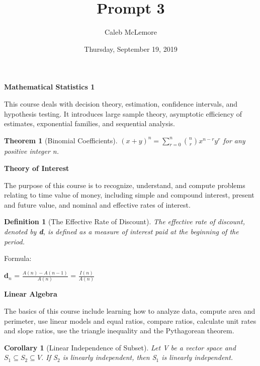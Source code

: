 \documentclass[12pt]{article}
\title{Prompt 3}
\author{Caleb McLemore }
\date{Thursday, September 19, 2019}
\newtheorem{thm}{Theorem}
\newtheorem{dfn}{Definition}
\newtheorem{cor}{Corollary}
\begin{document}
\maketitle
\newpage


\begin{center}
    \textbf{Mathematical Statistics 1}
\end{center}
This course deals with decision theory, estimation, confidence intervals, and hypothesis testing. It introduces large sample theory, asymptotic efficiency of estimates, exponential families, and sequential analysis.
\begin{thm}[Binomial Coefficients]
\((x+y)^{n} = \sum_{r=0}^{n} {{n}\choose{r}} x^{n-r} y^{r}\) for any positive integer n.
\end{thm}


\begin{center}
    \textbf{Theory of Interest}
\end{center}
The purpose of this course is to recognize, understand, and compute problems relating to time value of money, including simple and compound interest, present and future value, and nominal and effective rates of interest.
\begin{dfn}[The Effective Rate of Discount]
The effective rate of discount, denoted by \textbf{d}, is defined as a measure of interest paid at the beginning of the period.
\end{dfn}
Formula:
\begin{center}
    \textbf{d\(_n\)} = \(\frac{A(n)-A(n-1)}{A(n)}\) = \(\frac{I(n)}{A(n)}\)
\end{center}


\begin{center}
    \textbf{Linear Algebra}
\end{center}
The basics of this course include learning how to analyze data, compute area and perimeter, use linear models and equal ratios, compare ratios, calculate unit rates and slope ratios, use the triangle inequality and the Pythagorean theorem.
\begin{cor}[Linear Independence of Subset] 
Let V be a vector space and \(S_1 \subseteq{S_2} \subseteq{V}\). If S\(_2\) is linearly independent, then S\(_1\) is linearly independent.
\end{cor}
\end{document}
